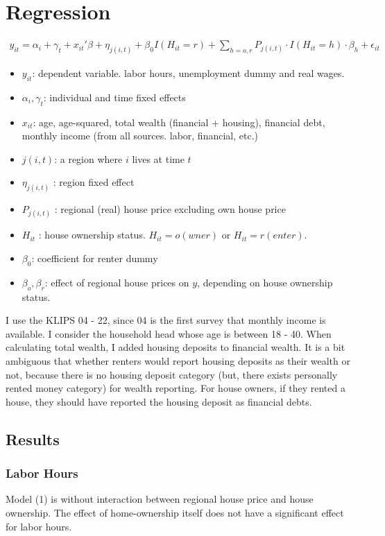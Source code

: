\documentclass[12pt,letterpaper]{article}
\begin{document}
\section{Regression}
\begin{eqnarray}
y_{it} = \alpha_i + \gamma_t + x_{it}'\beta + \eta_{j(i,t)} +\beta_0 I(H_{it} = r) + \sum_{h=o,r} P_{j(i,t)}\cdot I(H_{it} = h)\cdot\beta_{h} + \epsilon_{it}
\end{eqnarray}
\begin{itemize}
	\item $y_{it}$: dependent variable. labor hours, unemployment dummy and real wages.
	\item $\alpha_i,\gamma_t$: individual and time fixed effects			\item $x_{it}$: age, age-squared, total wealth (financial + housing), financial debt, monthly income (from all sources. labor, financial, etc.)
	\item $j(i,t)$: a region where $i$ lives at time $t$
	\item $\eta_{j(i,t)}$ : region fixed effect
	\item $P_{j(i,t)}$ : regional (real) house price excluding own house price
	\item $H_{it}$ : house ownership status. $H_{it} = o(wner)$ or $H_{it}=r(enter)$.
	\item $\beta_0$: coefficient for renter dummy
	\item $\beta_o,\beta_r$: effect of regional house prices on $y$, depending on house ownership status.
\end{itemize}
I use the KLIPS 04 - 22, since 04 is the first survey that monthly income is available. I consider the household head whose age is between 18 - 40. When calculating total wealth, I added housing deposits to financial wealth. It is a bit ambiguous that whether renters would report housing deposits as their wealth or not, because there is no housing deposit category (but, there exists personally rented money category) for wealth reporting. For house owners, if they rented a house, they should have reported the housing deposit as financial debts.
\newpage
\subsection{Results}
\subsubsection{Labor Hours}

Model (1) is without interaction between regional house price and house ownership. The effect of home-ownership itself does not have a significant effect for labor hours.
\end{document}
